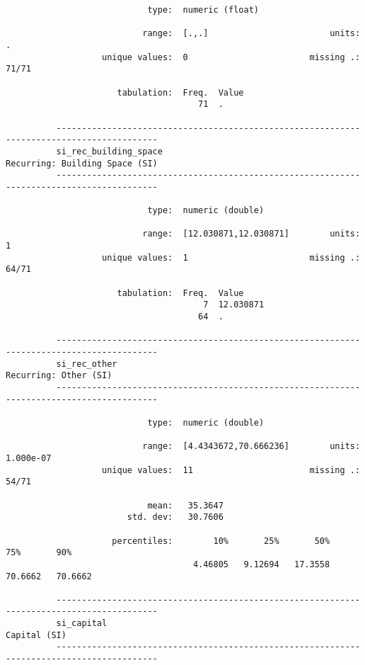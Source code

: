 \documentclass{article}
\begin{document}
\begin{verbatim}
                            type:  numeric (float)
          
                           range:  [.,.]                        units:  .
                   unique values:  0                        missing .:  71/71
          
                      tabulation:  Freq.  Value
                                      71  .
          
          ------------------------------------------------------------------------------------------
          si_rec_building_space                                       Recurring: Building Space (SI)
          ------------------------------------------------------------------------------------------
          
                            type:  numeric (double)
          
                           range:  [12.030871,12.030871]        units:  1
                   unique values:  1                        missing .:  64/71
          
                      tabulation:  Freq.  Value
                                       7  12.030871
                                      64  .
          
          ------------------------------------------------------------------------------------------
          si_rec_other                                                         Recurring: Other (SI)
          ------------------------------------------------------------------------------------------
          
                            type:  numeric (double)
          
                           range:  [4.4343672,70.666236]        units:  1.000e-07
                   unique values:  11                       missing .:  54/71
          
                            mean:   35.3647
                        std. dev:   30.7606
          
                     percentiles:        10%       25%       50%       75%       90%
                                     4.46805   9.12694   17.3558   70.6662   70.6662
          
          ------------------------------------------------------------------------------------------
          si_capital                                                                    Capital (SI)
          ------------------------------------------------------------------------------------------
          

\end{verbatim}
\end{document}
